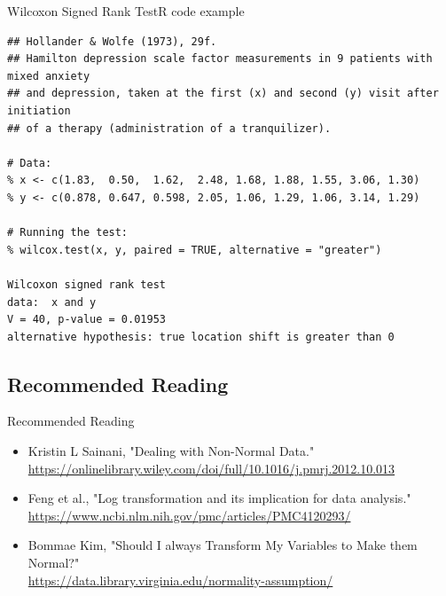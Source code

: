 \begin{frame}[fragile]{Wilcoxon Signed Rank Test}{R code example}

{\smaller
\begin{verbatim}
## Hollander & Wolfe (1973), 29f.
## Hamilton depression scale factor measurements in 9 patients with mixed anxiety
## and depression, taken at the first (x) and second (y) visit after initiation
## of a therapy (administration of a tranquilizer).

# Data:
% x <- c(1.83,  0.50,  1.62,  2.48, 1.68, 1.88, 1.55, 3.06, 1.30)
% y <- c(0.878, 0.647, 0.598, 2.05, 1.06, 1.29, 1.06, 3.14, 1.29)

# Running the test:
% wilcox.test(x, y, paired = TRUE, alternative = "greater")

Wilcoxon signed rank test
data:  x and y
V = 40, p-value = 0.01953
alternative hypothesis: true location shift is greater than 0
\end{verbatim}}
\end{frame}

\subsection{Recommended Reading}
\begin{frame}{Recommended Reading}{}

  {\smaller
  \begin{itemize}
    \item Kristin L Sainani, "Dealing with Non-Normal Data."\\ \url{https://onlinelibrary.wiley.com/doi/full/10.1016/j.pmrj.2012.10.013}
    \item Feng et al., "Log transformation and its implication for data analysis."\\ \url{https://www.ncbi.nlm.nih.gov/pmc/articles/PMC4120293/}
    \item Bommae Kim, "Should I always Transform My Variables to Make them Normal?"\\ \url{https://data.library.virginia.edu/normality-assumption/}
  \end{itemize}}

\end{frame}
